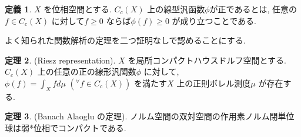 \documentclass[10pt, fleqn, label-section=none, titlepage]{bxjsarticle}
\theoremstyle{definition}
\newtheorem{dfn}{定義}[section]
\newtheorem{thm}[dfn]{定理}
\newcommand{\any}{{}^{\forall}}
\renewcommand{\;}{\, ; \,}
\begin{document}
\begin{dfn}
$X$ を位相空間とする. $C_c(X)$ 上の線型汎函数$\phi$が正であるとは, 任意の$f \in C_c(X)$ に対して$f\geq 0$ ならば$\phi(f) \geq 0$ が成り立つことである.
\end{dfn}

よく知られた関数解析の定理を二つ証明なしで認めることにする.

\begin{thm}
(Riesz representation).
$X$ を局所コンパクトハウスドルフ空間とする. $C_c (X)$ 上の任意の正の線形汎関数$\phi $ に対して, $\phi(f) = \int_X f d\mu \,\, (\any f \in C_c (X))$ を満たす$X$ 上の正則ボレル測度$\mu$ が存在する.
\end{thm}



\begin{thm}
(Banach Alaoglu の定理).
ノルム空間の双対空間の作用素ノルム閉単位球は弱*位相でコンパクトである.
\end{thm}
\end{document}
